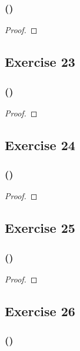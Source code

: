 \documentclass[14pt]{extarticle}
\begin{document}
\subsubsection{()}

\begin{proof}

\end{proof}

\subsection{Exercise 23}

\subsubsection{()}

\begin{proof}

\end{proof}

\subsection{Exercise 24}

\subsubsection{()}

\begin{proof}

\end{proof}

\subsection{Exercise 25}

\subsubsection{()}

\begin{proof}

\end{proof}

\subsection{Exercise 26}

\subsubsection{()}
\end{document}
